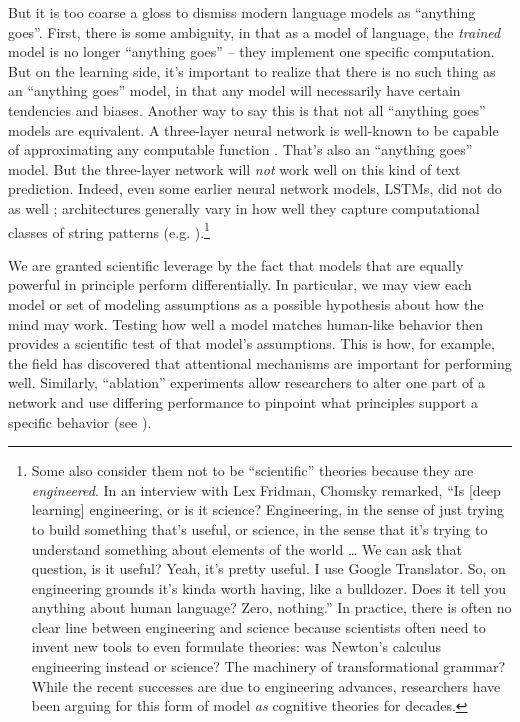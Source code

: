 \documentclass[output=paper,colorlinks,citecolor=brown]{langscibook}
\begin{document}
But it is too coarse a gloss to dismiss modern language models as ``anything goes''. First, there is some ambiguity, in that as a model of language, the \textit{trained} model is no longer ``anything goes'' -- they implement one specific computation. But on the learning side, it's important to realize that there is no such thing as an ``anything goes'' model, in that any model will necessarily have certain tendencies and biases. Another way to say this is that not all ``anything goes'' models are equivalent. A three-layer neural network is well-known to be capable of approximating any computable function \citep{siegelmann1995computational}. That's also an ``anything goes'' model. But the three-layer network will \textit{not} work well on this kind of text prediction. Indeed, even some earlier neural network models, LSTMs, did not do as well \citep{futrell2019neural,marvin2018targeted,hu2020systematic};  architectures generally vary in how well they capture  computational classes of string patterns (e.g. \citealt{deletang2022neural}).\footnote{ Some also consider them not to be ``scientific'' theories because they are \textit{engineered}. In an interview with Lex Fridman, Chomsky remarked, ``Is [deep learning] engineering, or is it science? Engineering, in the sense of just trying to build something that's useful, or science, in the sense that it's trying to understand something about elements of the world  \ldots{}  We can ask that question, is it useful? Yeah, it's pretty useful. I use Google Translator. So, on engineering grounds it's kinda worth having, like a bulldozer. Does it tell you anything about human language? Zero, nothing.'' In practice, there is often no clear line between engineering and science because scientists often need to invent new tools to even formulate theories: was Newton's calculus engineering instead or science? The machinery of transformational grammar? While the recent successes are due to engineering advances, researchers have been arguing for this form of model \textit{as} cognitive theories for decades.}

We are granted scientific leverage by the fact that models that are equally powerful in principle perform differentially. In particular, we may view each model or set of modeling assumptions as a possible hypothesis about how the mind may work. Testing how well a model matches human-like behavior then provides a scientific test of that model's assumptions. This is how, for example, the field has discovered that attentional mechanisms are important for performing well.  Similarly, ``ablation'' experiments allow researchers to alter one part of a network and use differing performance to pinpoint what principles support a specific behavior (see \citealt{warstadt2022artificial}). 
\end{document}
